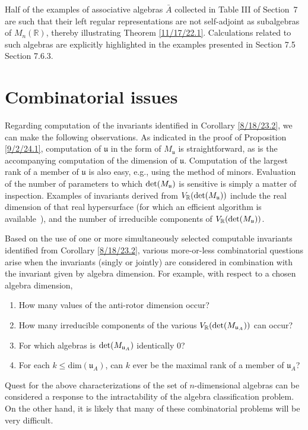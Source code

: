 \documentclass{amsart}
\theoremstyle{definition}
\numberwithin{theorem}{section}
\numberwithin{equation}{section}
\begin{document}
 Half of the examples of associative algebras $\bar{A}$ collected in Table III of \mbox{Section 7} are such that their left regular representations are not self-adjoint as subalgebras of $M_n(\mathbb{R})$, thereby illustrating Theorem \ref{11/17/22.1}.  Calculations related to such algebras are explicitly highlighted in the examples presented in Section 7.5 Section 7.6.3.


  \section{Combinatorial issues}
Regarding computation of the invariants identified in Corollary \ref{8/18/23.2}, we can make the following observations.  As indicated in the proof of Proposition \ref{9/2/24.1}, computation of $\mathfrak{u}$ in the form of $M_\mathfrak{u}$ is straightforward, as is the accompanying computation of the dimension of $\mathfrak{u}$.   Computation of the largest rank of a member of $\mathfrak{u}$ is also easy, e.g., using the method of minors.   Evaluation of the number of parameters to which ${\rm det}(M_{\mathfrak{u}})$ is sensitive is simply a matter of inspection.  Examples of invariants derived from $V_\mathbb{R}({\rm det}(M_{\mathfrak{u}}))$ include the real dimension of that real hypersurface (for which an efficient algorithm is \mbox{available \cite{bannwarth:2015})}, and the number of irreducible components of $V_\mathbb{R}({\rm det}(M_{\mathfrak{u}}))$.  

 
Based on the use of one or more simultaneously selected computable invariants identified from Corollary \ref{8/18/23.2}, various more-or-less combinatorial questions arise when the invariants (singly or jointly) are considered in combination with the invariant given by algebra dimension.  For example, with respect to a chosen algebra dimension,  

\begin{enumerate} \item How many values of the anti-rotor dimension occur?  \item How many irreducible components of the various $V_\mathbb{R}({\rm det}(M_{\mathfrak{u}_A}))$ can occur?  \item For which algebras is ${\rm det}(M_{\mathfrak{u}_A})$ identically $0$?  \item For each $k\le \text{dim}(\mathfrak{u}_A)$, can $k$ ever be the maximal rank of a member of $\mathfrak{u}_A$?   \end{enumerate}  
 Quest for the above characterizations of the set of $n$-dimensional algebras can be considered a response to the intractability of the algebra classification problem.  On the other hand, it is likely that many of these combinatorial problems will be very difficult.
\end{document}
